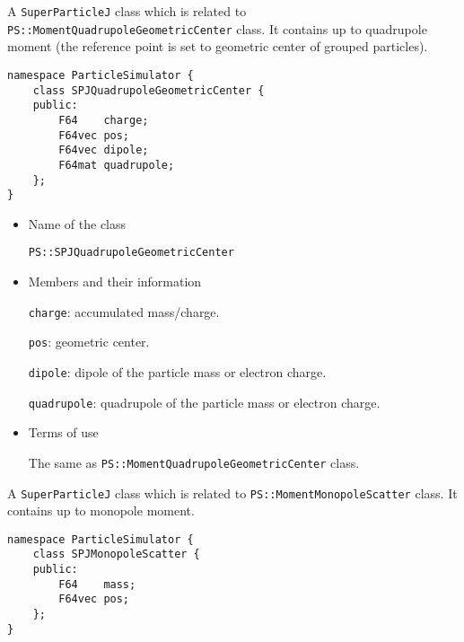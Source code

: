 \label{sec:SPJQuadrupoleGeometricCenter}

A \texttt{SuperParticleJ} class which is related to \texttt{PS::MomentQuadrupoleGeometricCenter} class. It contains up to quadrupole moment (the reference point is set to geometric center of grouped particles).

\begin{screen}
\begin{verbatim}
namespace ParticleSimulator {
    class SPJQuadrupoleGeometricCenter {
    public:
        F64    charge;
        F64vec pos;
        F64vec dipole;
        F64mat quadrupole;
    };
}
\end{verbatim}
\end{screen}

\begin{itemize}

\item Name of the class

  \texttt{PS::SPJQuadrupoleGeometricCenter}

\item Members and their information

  \texttt{charge}: accumulated mass/charge.

  \texttt{pos}: geometric center.

  \texttt{dipole}: dipole of the particle mass or electron charge.

  \texttt{quadrupole}: quadrupole of the particle mass or electron charge.

\item Terms of use

  The same as \texttt{PS::MomentQuadrupoleGeometricCenter} class.

\end{itemize}


\label{sec:SPJMonopoleScatter}

A \texttt{SuperParticleJ} class which is related to \texttt{PS::MomentMonopoleScatter} class. It contains up to monopole moment.

\begin{screen}
\begin{verbatim}
namespace ParticleSimulator {
    class SPJMonopoleScatter {
    public:
        F64    mass;
        F64vec pos;
    };
}
\end{verbatim}
\end{screen}

